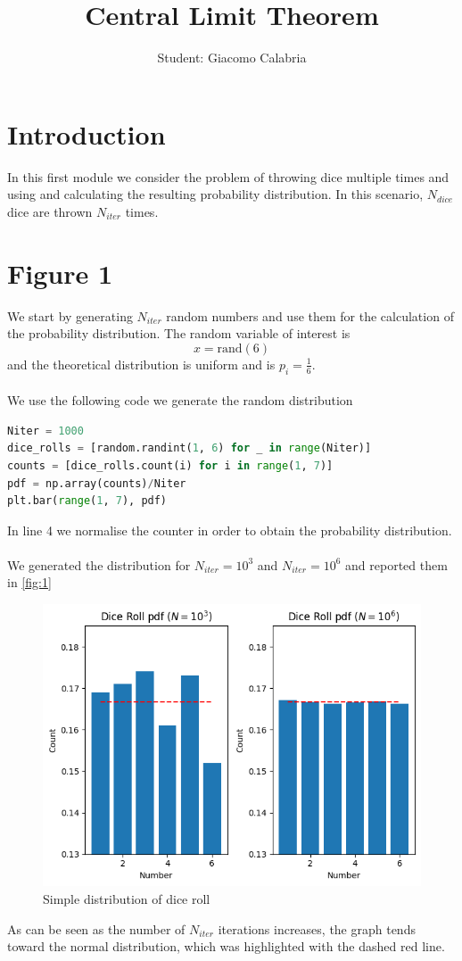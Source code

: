 \documentclass{article}
\title{\textbf{Central Limit Theorem}}
\author{Student: Giacomo Calabria}
\date{}
\begin{document}
\maketitle

\section*{Introduction}
In this first module we consider the problem of throwing dice multiple times and using and calculating the resulting probability distribution. In this scenario, $N_{dice}$ dice are thrown $N_{iter}$ times.
\section{Figure 1}
We start by generating $N_{iter}$ random numbers and use them for the calculation of the probability distribution. The random variable of interest is
\begin{equation}
    x=\text{rand}(6)
\end{equation}
and the theoretical distribution is uniform and is $p_i=\frac16$.\\\\
We use the following code we generate the random distribution
\begin{lstlisting}[language=Python]
Niter = 1000
dice_rolls = [random.randint(1, 6) for _ in range(Niter)]
counts = [dice_rolls.count(i) for i in range(1, 7)]
pdf = np.array(counts)/Niter
plt.bar(range(1, 7), pdf)
\end{lstlisting}
In line 4 we normalise the counter in order to obtain the probability distribution.\\\\
We generated the distribution for $N_{iter}=10^3$ and $N_{iter}=10^6$ and reported them in \autoref{fig:1}
\begin{figure}[H]
    \centering
    \includegraphics[width=.7\linewidth]{images/Figure1b.png}
    \caption{Simple distribution of dice roll}
    \label{fig:1}
\end{figure}
\noindent As can be seen as the number of $N_{iter}$ iterations increases, the graph tends toward the normal distribution, which was highlighted with the dashed red line.
\clearpage
\end{document}
